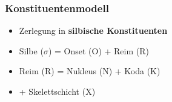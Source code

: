 
\begin{frame}
\frametitle{Konstituentenmodell}

\begin{itemize}
	\item Zerlegung in \textbf{silbische Konstituenten}
	\item Silbe ($\sigma$) = Onset (O) + Reim (R)
	\item Reim (R) = Nukleus (N) + Koda (K)
	\item + Skelettschicht (X)
\end{itemize}


\begin{figure}
%
\centering
{}

\end{figure}

\end{frame}




